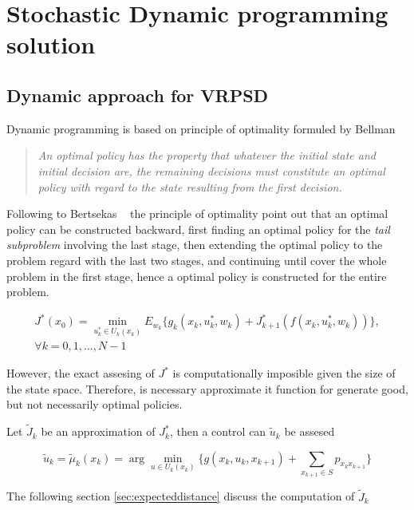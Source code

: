 \chapter{Stochastic Dynamic programming solution}
\label{chap:dp_methodology}


\section{Dynamic approach for VRPSD}

Dynamic programming is based on principle of optimality formuled by Bellman ~\cite{bellman_theory_1954}

\begin{quote}
 \textit{An optimal policy has the property that whatever the initial state and initial decision are, the remaining decisions must constitute an optimal policy with regard to the state resulting from the first decision.}
\end{quote}

Following to Bertsekas ~\cite{bertsekas_dynamic_1995} the principle of optimality point out that an optimal policy can be constructed backward, first finding an optimal policy for the \textit{tail subproblem} involving the last stage, then extending the optimal policy to the problem regard with the last two stages, and continuing until cover the whole problem in the first stage, hence a optimal policy is constructed for the entire problem.

\begin{multline}
 J^*(x_0) = \min\limits_{u_k^*\in U_k(x_k)}E_{w_k}\biggr\{g_k(x_k,u_k^*,w_k)+J^*_{k+1}(f(x_k,u_k^*,w_k))\biggr\},\\
\forall k=0,1,\ldots,N-1
\end{multline}

However, the exact assesing of $J^*$ is computationally imposible given the size of the state space. Therefore, is necessary approximate it function for generate good, but not necessarily optimal policies.

Let $\tilde{J}_k$ be an approximation of $J^*_k$, then a control can $\tilde{u}_k$ be assesed

\begin{equation}\label{eq:control_aprox}
\tilde{u}_k=\tilde{\mu}_k(x_k)=\arg \min\limits_{u\in U_k(x_k)} \biggr\{ g(x_k,u_k,x_{k+1}) + \sum_{x_{k+1}\in S}p_{x_kx_{k+1}}\biggr\}
\end{equation}

The following section \ref{sec:expecteddistance} discuss the computation of $\tilde{J}_k$

